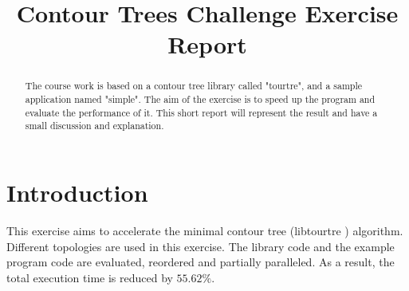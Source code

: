 \documentclass[conference]{IEEEtran}
\begin{document}
%
\title{Contour Trees Challenge Exercise Report}


\author{
\and
{}
\and
{}
}

\maketitle

\begin{abstract}
The course work is based on a contour tree library called "tourtre",
and a sample application named "simple". The aim of the exercise is to speed up the program and evaluate the performance of it. This short report will represent the result and have a small discussion and explanation. 
\end{abstract}

\IEEEpeerreviewmaketitle

\section{Introduction}

This exercise aims to accelerate the minimal contour tree (libtourtre \cite{libtourtre}) algorithm. Different topologies are used in this exercise. The library code and the example program code are evaluated, reordered and partially paralleled. As a result, the total execution time is reduced by $55.62 \%$.
\end{document}
